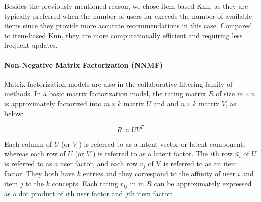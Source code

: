         
            Besides the previously mentioned reason, we chose item-based Knn, as they are typically preferred when the number of users far exceeds the number of available items since they provide more accurate recommendations in this case. Compared to item-based Knn, they are more computationally efficient and requiring less frequent updates.

        \vspace{0.25cm}
        \noindent \paragraph{Non-Negative Matrix Factorization (NNMF)}
        \vspace{0.25cm}
       
            Matrix factorization models \cite{koren20009mf} are also in the collaborative filtering family of methods. In a basic matrix factorization model, the rating matrix $R$ of size $m\times n$ is approximately factorized into $m\times k$ matrix $U$ and and $n\times k$ matrix $V$, as below:
            
           \begin{equation}
               R\approx UV^T
           \end{equation}
       
            Each column of $U$ (or $V$ ) is referred to as a latent vector or latent component, whereas each row of $U$ (or $V$ ) is referred to as a latent factor. The $i$th row $\bar{u_i}$ of $U$ is referred to as a user factor, and each row $\bar{v_j}$ of V is referred to as an item factor. They both have $k$ entries and they correspond to the affinity of user $i$ and item $j$ to the $k$ concepts. Each rating $r_{ij}$ in in $R$ can be approximately expressed as a dot product of $i$th user factor and $j$th item factor:
       
